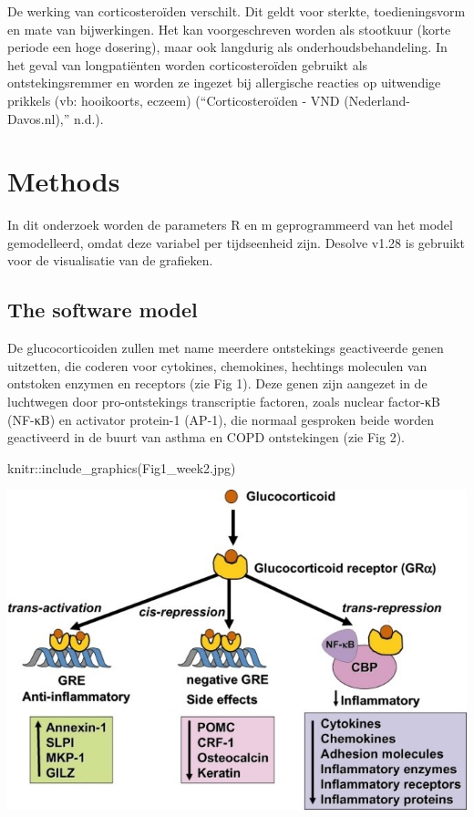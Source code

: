 \documentclass[
]{article}
\newenvironment{Shaded}{\begin{snugshade}}{\end{snugshade}}
\newcommand{\FunctionTok}[1]{\textcolor[rgb]{0.00,0.00,0.00}{#1}}
\newcommand{\NormalTok}[1]{#1}
\newcommand{\SpecialCharTok}[1]{\textcolor[rgb]{0.00,0.00,0.00}{#1}}
\newcommand{\StringTok}[1]{\textcolor[rgb]{0.31,0.60,0.02}{#1}}
\begin{document}
De werking van corticosteroïden verschilt. Dit geldt voor sterkte,
toedieningsvorm en mate van bijwerkingen. Het kan voorgeschreven worden
als stootkuur (korte periode een hoge dosering), maar ook langdurig als
onderhoudsbehandeling. In het geval van longpatiënten worden
corticosteroïden gebruikt als ontstekingsremmer en worden ze ingezet bij
allergische reacties op uitwendige prikkels (vb: hooikoorts, eczeem)
({``Corticosteroïden - VND (Nederland-Davos.nl),''} n.d.).

\hypertarget{methods}{%
\section{Methods}\label{methods}}

In dit onderzoek worden de parameters R en m geprogrammeerd van het
model gemodelleerd, omdat deze variabel per tijdseenheid zijn. Desolve
v1.28 is gebruikt voor de visualisatie van de grafieken.

\hypertarget{the-software-model}{%
\subsection{The software model}\label{the-software-model}}

De glucocorticoiden zullen met name meerdere ontstekings geactiveerde
genen uitzetten, die coderen voor cytokines, chemokines, hechtings
moleculen van ontstoken enzymen en receptors (zie Fig 1). Deze genen
zijn aangezet in de luchtwegen door pro-ontstekings transcriptie
factoren, zoals nuclear factor-κB (NF-κB) en activator protein-1 (AP-1),
die normaal gesproken beide worden geactiveerd in de buurt van asthma en
COPD ontstekingen (zie Fig 2).

\begin{Shaded}
\begin{Highlighting}[]
\NormalTok{knitr}\SpecialCharTok{::}\FunctionTok{include\_graphics}\NormalTok{(}\StringTok{\textquotesingle{}Fig1\_week2.jpg\textquotesingle{}}\NormalTok{)}
\end{Highlighting}
\end{Shaded}

\includegraphics{Fig1_week2.jpg}
\end{document}
